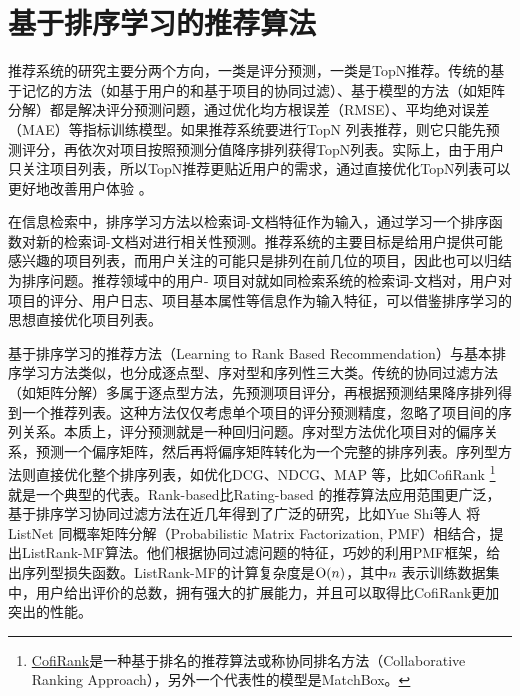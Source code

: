 \section{基于排序学习的推荐算法}
推荐系统的研究主要分两个方向，一类是评分预测，一类是TopN推荐。传统的基于记忆的方法（如基于用户的和基于项目的协同过滤）、基于模型的方法（如矩阵分解）都是解决评分预测问题，通过优化均方根误差（RMSE）、平均绝对误差（MAE）等指标训练模型。如果推荐系统要进行TopN 列表推荐，则它只能先预测评分，再依次对项目按照预测分值降序排列获得TopN列表。实际上，由于用户只关注项目列表，所以TopN推荐更贴近用户的需求，通过直接优化TopN列表可以更好地改善用户体验
\cite{karatzoglou2013learning}。

在信息检索中，排序学习方法以检索词-文档特征作为输入，通过学习一个排序函数对新的检索词-文档对进行相关性预测。推荐系统的主要目标是给用户提供可能感兴趣的项目列表，而用户关注的可能只是排列在前几位的项目，因此也可以归结为排序问题。推荐领域中的用户- 项目对就如同检索系统的检索词-文档对，用户对项目的评分、用户日志、项目基本属性等信息作为输入特征，可以借鉴排序学习的思想直接优化项目列表。

基于排序学习的推荐方法（Learning to Rank Based Recommendation）与基本排序学习方法类似，也分成逐点型、序对型和序列性三大类。传统的协同过滤方法（如矩阵分解）多属于逐点型方法，先预测项目评分，再根据预测结果降序排列得到一个推荐列表。这种方法仅仅考虑单个项目的评分预测精度，忽略了项目间的序列关系。本质上，评分预测就是一种回归问题。序对型方法优化项目对的偏序关系，预测一个偏序矩阵，然后再将偏序矩阵转化为一个完整的排序列表。序列型方法则直接优化整个排序列表，如优化DCG、NDCG、MAP 等，比如CofiRank\cite{weimer2007cofirank}
\footnote{\href{http://www.cofirank.org/}{CofiRank}是一种基于排名的推荐算法或称协同排名方法（Collaborative Ranking Approach），另外一个代表性的模型是MatchBox。}
就是一个典型的代表。Rank-based比Rating-based 的推荐算法应用范围更广泛，基于排序学习协同过滤方法在近几年得到了广泛的研究，比如Yue Shi等人
\cite{shi2010list} 将ListNet 同概率矩阵分解（Probabilistic Matrix Factorization, PMF）相结合，提出ListRank-MF算法。他们根据协同过滤问题的特征，巧妙的利用PMF框架，给出序列型损失函数。ListRank-MF的计算复杂度是$\operatorname{\mathrm{O}}(n)$，其中$n$ 表示训练数据集中，用户给出评价的总数，拥有强大的扩展能力，并且可以取得比CofiRank更加突出的性能。

